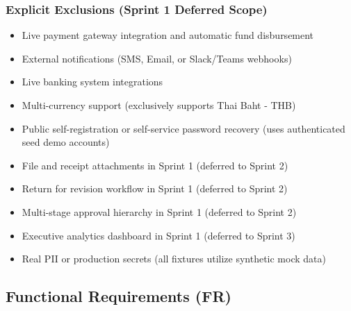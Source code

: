 \documentclass[11pt,a4paper]{article}
\begin{document}
\subsubsection{Explicit Exclusions (Sprint 1 Deferred Scope)}
\begin{itemize}[leftmargin=*,itemsep=2pt,topsep=2pt]
  \item Live payment gateway integration and automatic fund disbursement
  \item External notifications (SMS, Email, or Slack/Teams webhooks)
  \item Live banking system integrations
  \item Multi-currency support (exclusively supports Thai Baht - THB)
  \item Public self-registration or self-service password recovery (uses authenticated seed demo accounts)
  \item File and receipt attachments in Sprint 1 (deferred to Sprint 2)
  \item Return for revision workflow in Sprint 1 (deferred to Sprint 2)
  \item Multi-stage approval hierarchy in Sprint 1 (deferred to Sprint 2)
  \item Executive analytics dashboard in Sprint 1 (deferred to Sprint 3)
  \item Real PII or production secrets (all fixtures utilize synthetic mock data)
\end{itemize}

\subsection{Functional Requirements (FR)}
\end{document}
